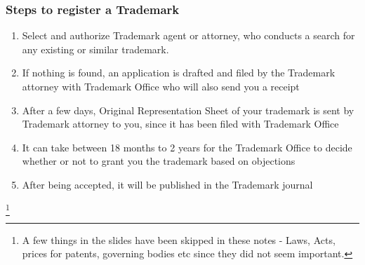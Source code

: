 \documentclass{article}
\begin{document}
\subsubsection{Steps to register a Trademark}

\begin{enumerate}
    \item Select and authorize Trademark agent or attorney, who conducts a search for any existing or similar trademark. 
    \item If nothing is found, an application is drafted and filed by the Trademark attorney with Trademark Office who will also send you a receipt
    \item After a few days, Original Representation Sheet of your trademark is sent by Trademark attorney to you, since it has been filed with Trademark Office
    \item It can take between 18 months to 2 years for the Trademark Office to decide whether or not to grant you the trademark based on objections
    \item After being accepted, it will be published in the Trademark journal
\end{enumerate}

\footnote{A few things in the slides have been skipped in these notes - Laws, Acts, prices for patents, governing bodies etc since they did not seem important.}
\end{document}
